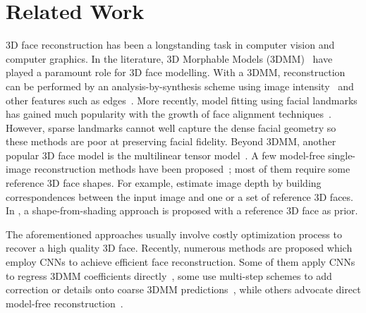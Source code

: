 \documentclass[10pt,twocolumn,letterpaper]{article}
\begin{document}
\section{Related Work}

3D face reconstruction has been a longstanding task in computer vision and computer graphics.
In the literature, 3D Morphable Models (3DMM)~\cite{blanz1999morphable,paysan20093d,booth20163d} have played a paramount role for 3D face modelling. With a 3DMM, reconstruction can be performed by an analysis-by-synthesis scheme using image intensity~\cite{blanz1999morphable} and other features such as edges~\cite{romdhani2005estimating}.
More recently, model fitting using facial landmarks has gained much popularity with the growth of face alignment techniques~\cite{blanz2004statistical,zhu2015high,hassner2015effective,bas2016fitting}. However, sparse landmarks cannot well capture the dense facial geometry so these methods are poor at preserving facial fidelity. Beyond 3DMM, another popular 3D face model is the multilinear tensor model~\cite{vlasic2005face,cao20133d,cao2014displaced,saito2016real}.
A few model-free single-image reconstruction methods have been proposed~\cite{hassner2006example,kemelmacher2011face,hassner2013viewing}; most of them require some reference 3D face shapes. For example, \cite{hassner2006example,hassner2013viewing} estimate image depth by building correspondences between the input image and one or a set of reference 3D faces. In \cite{kemelmacher2011face}, a shape-from-shading approach is proposed with a reference 3D face as prior.

The aforementioned approaches usually involve costly optimization process to recover a high quality 3D face. Recently, numerous methods are proposed which employ CNNs to achieve efficient face reconstruction.
Some of them apply CNNs to regress 3DMM coefficients directly~\cite{richardson20163d,dou2017end,bas20173d,tewari2017mofa,tran2017regressing,genova2018unsupervised}, some use multi-step schemes to add correction or details onto coarse 3DMM predictions~\cite{richardson2017learning,tewari2018self,tran2018extreme,guo2018cnn}, while others advocate direct model-free reconstruction~\cite{sela2017unrestricted,tran2018nonlinear,sengupta2018sfsnet,feng2018joint}.
\end{document}
